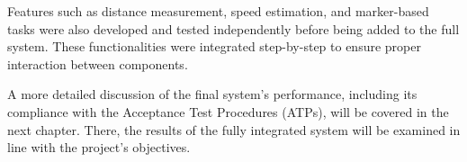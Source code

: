Features such as distance measurement, speed estimation, and marker-based tasks were also developed and tested independently before being added to the full system. These functionalities were integrated step-by-step to ensure proper interaction between components.

A more detailed discussion of the final system’s performance, including its compliance with the Acceptance Test Procedures (ATPs), will be covered in the next chapter. There, the results of the fully integrated system will be examined in line with the project's objectives.